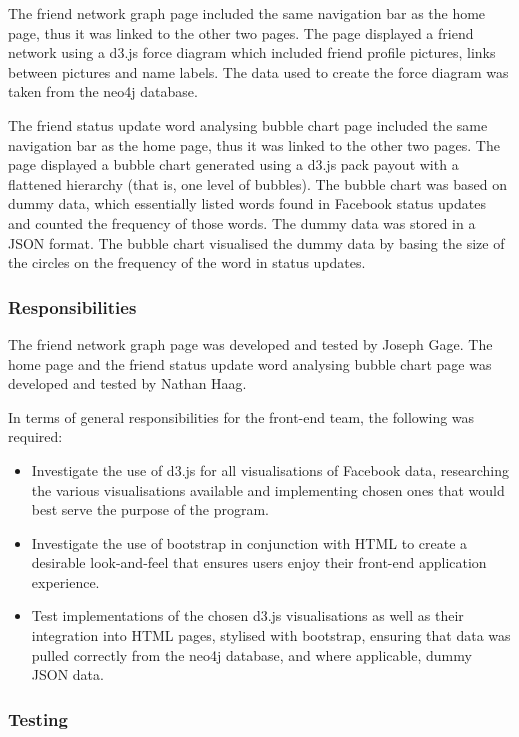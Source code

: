 \documentclass[10pt,onecolumn]{article}
\begin{document}
The friend network graph page included the same navigation bar as the home page, thus it was linked to the other two pages. The page displayed a friend network using a d3.js force diagram which included friend profile pictures, links between pictures and name labels. The data used to create the force diagram was taken from the neo4j database. 

The friend status update word analysing bubble chart page included the same navigation bar as the home page, thus it was linked to the other two pages. The page displayed a bubble chart generated using a d3.js pack payout with a flattened hierarchy (that is, one level of bubbles). The bubble chart was based on dummy data, which essentially listed words found in Facebook status updates and counted the frequency of those words. The dummy data was stored in a JSON format. The bubble chart visualised the dummy data by basing the size of the circles on the frequency of the word in status updates. 

\subsubsection{Responsibilities}
The friend network graph page was developed and tested by Joseph Gage. The home page and the friend status update word analysing bubble chart page was developed and tested by Nathan Haag.

In terms of general responsibilities for the front-end team, the following was required:

\begin{itemize}
	\item Investigate the use of d3.js for all visualisations of Facebook data, researching the various visualisations available and implementing chosen ones that would best serve the purpose of the program. 
	\item Investigate the use of bootstrap in conjunction with HTML to create a desirable look-and-feel that ensures users enjoy their front-end application experience. 
	\item Test implementations of the chosen d3.js visualisations as well as their integration into HTML pages, stylised with bootstrap, ensuring that data was pulled correctly from the neo4j database, and where applicable, dummy JSON data.  
\end{itemize}

\subsubsection{Testing}
\end{document}
